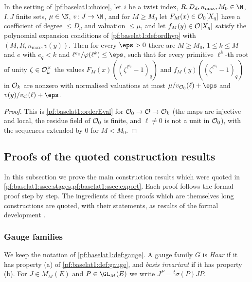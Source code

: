\begin{corollary}\label{pf:baselat1:existsLevel}
In the setting of \cref{pf:baselat1:choice}, let $i$ be a twist index, $R,D_d,n_{\max},M_0\in\N$, $I,J$ finite sets,
$\mu\in\N$, $v\colon J\to\N$, and for $M\ge M_0$ let $F_M(x)\in\mathcal O_0[X_q]$ have a coefficient of degree $\le D_d$ and
valuation $\le\mu$, and let $f_M(y)\in\mathcal O[X_q]$ satisfy the polynomial expansion conditions of
\cref{pf:baselat1:def:ordhyp} with $(M,R,n_{\max},v(y))$. Then for every $\eps>0$ there are $M\ge M_0$, $1\le k\le M$ and
$e$ with $e_q<k$ and $\ell^{e_q}/\varphi(\ell^k)\le\eps$, such that for every primitive $\ell^k$-th root of unity
$\zeta\in\mathcal O_k^\times$ the values $F_M(x)((\zeta^{\ell^{e_q}}-1)_q)$ and $f_M(y)((\zeta^{\ell^{e_q}}-1)_q)$ in
$\mathcal O_k$ are nonzero with normalised valuations at most $\mu/v_{\baselatoneO_0}(\ell)+\eps$ and
$v(y)/v_{\baselatoneO}(\ell)+\eps$.
\end{corollary}

\begin{proof}
This is \cref{pf:baselat1:orderEval} for $\mathcal O_0\to\mathcal O\to\mathcal O_k$ (the maps are injective and
local, the residue field of $\mathcal O_0$ is finite, and $\ell\ne0$ is not a unit in $\mathcal O_0$), with the sequences
extended by $0$ for $M<M_0$.
\end{proof}

\subsection{Proofs of the quoted construction results}\label{pf:baselat1:ssec:deferred}

In this subsection we prove the main construction results which were quoted in
\cref{pf:baselat1:ssec:stages,pf:baselat1:ssec:export}. Each proof follows the formal proof step by step. The
ingredients of these proofs which are themselves long constructions are quoted, with their statements, as results
of the formal development \cite{LeanSource2026}.

\subsubsection{Gauge families}\label{pf:baselat1:sssec:gaugeproofs}

We keep the notation of \cref{pf:baselat1:def:gauge}. A gauge family $G$ is \emph{Haar} if it has property (a) of
\cref{pf:baselat1:def:gauge}, and \emph{basis invariant} if it has property (b). For $J\in M_M(E)$ and
$P\in\GL_M(E)$ we write $J^P={}^t\!\sigma(P)JP$.

